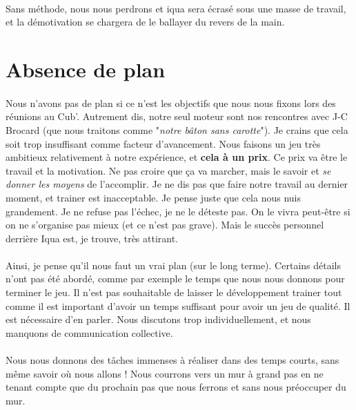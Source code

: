 \documentclass{report}
\begin{document}
\paragraph{}
Sans méthode, nous nous perdrons et iqua sera écrasé sous une masse de travail, et la démotivation se chargera de le ballayer du revers de la main.

\section{Absence de plan}
\paragraph{}

\paragraph{}
Nous n'avons pas de plan si ce n'est les objectifs que nous nous fixons lors des réunions au Cub'. 
Autrement dis, notre seul moteur sont nos rencontres avec J-C Brocard (que nous traitons comme "\textit{notre bâton sans carotte}").
Je crains que cela soit trop insuffisant comme facteur d'avancement. Nous faisons un jeu très ambitieux relativement à notre expérience, et \textbf{cela à un prix}.
Ce prix va être le travail et la motivation. Ne pas croire que ça va marcher, mais le savoir et \textit{se donner les moyens} de l'accomplir.
Je ne dis pas que faire notre travail au dernier moment, et trainer est inacceptable. Je pense juste que cela nous nuis grandement.
Je ne refuse pas l'échec, je ne le déteste pas. On le vivra peut-être si on ne s'organise pas mieux (et ce n'est pas grave).
Mais le succès personnel derrière Iqua est, je trouve, très attirant.

\paragraph{}
Ainsi, je pense qu'il nous faut un vrai plan (sur le long terme). Certains détails n'ont pas été abordé, comme par exemple le temps que nous nous donnons pour terminer le jeu. Il n'est pas souhaitable de laisser le développement trainer tout comme il est important d'avoir un temps suffisant pour avoir un jeu de qualité. Il est nécessaire d'en parler. Nous discutons trop individuellement, et nous manquons de communication collective.

\paragraph{}
Nous nous donnons des tâches immenses à réaliser dans des temps courts, sans même savoir où nous allons !
Nous courrons vers un mur à grand pas en ne tenant compte que du prochain pas que nous ferrons et sans nous préoccuper du mur.
\end{document}
